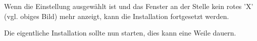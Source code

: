 \documentclass[ngerman,oneside, a4letter]{article}
\begin{document}
\begin{center}
\end{center}
Wenn die Einstellung ausgewählt ist und das Fenster an der Stelle kein rotes 'X' (vgl. obiges Bild) mehr anzeigt, kann die Installation fortgesetzt werden.

\begin{center}
\end{center}
Die eigentliche Installation sollte nun starten, dies kann eine Weile dauern.
\end{document}
